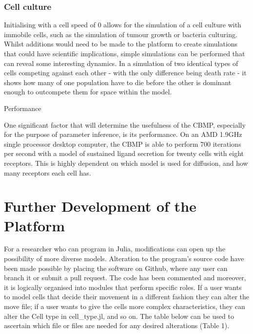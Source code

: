 \documentclass[12pt,a4paper]{report}
\begin{document}
\subsubsection{Cell culture }
Initialising with a cell speed of 0 allows for the simulation of a cell 
culture with immobile cells, such as the simulation of tumour growth or 
bacteria culturing. Whilst additions would need to be made to the 
platform to create simulations that could have scientific implications, 
simple simulations can be performed that can reveal some interesting 
dynamics. In a simulation of two identical types of cells competing 
against each other - with the only difference being death rate - it 
shows how many of one population have to die before the other is 
dominant enough to outcompete them for space within the model.





Performance

One significant factor that will determine the usefulness of the CBMP, 
especially for the purpose of parameter inference, is its performance. 
On an AMD 1.9GHz single processor desktop computer, the CBMP is able to 
perform 700 iterations per second with a model of sustained ligand 
secretion for twenty cells with eight receptors. This is highly 
dependent on which model is used for diffusion, and how many receptors 
each cell has.

\section{Further Development of the 
Platform}
For a researcher who can program in Julia, modifications can open up the 
possibility of more diverse models. Alteration to the program's source 
code have been made possible by placing the software on Github, where 
any user can branch it or submit a pull request. The code has been 
commented and moreover, it is logically organised into modules that 
perform specific roles. If a user wants to model cells that decide their 
movement in a different fashion they can alter the move file; if a user 
wants to give the cells more complex characteristics, they can alter the 
Cell type in cell\_type.jl, and so on. The table below can be used to 
ascertain which file or files are needed for any desired alterations 
(Table 1).
\end{document}
